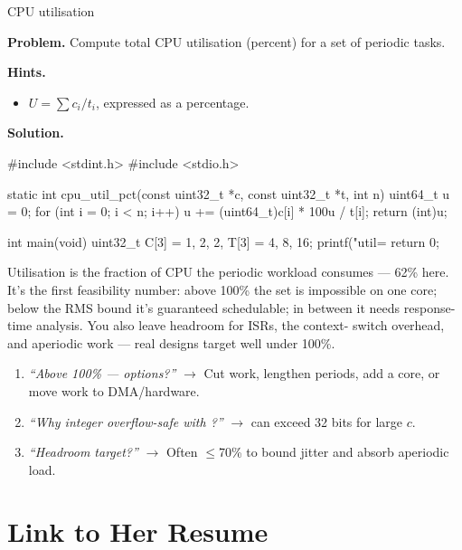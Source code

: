 \begin{gymproblem}{CPU utilisation}

\textbf{Problem.} Compute total CPU utilisation (percent) for a set of periodic
tasks.

\textbf{Hints.}
\begin{itemize}
\item $U=\sum c_i/t_i$, expressed as a percentage.
\end{itemize}

\attempt

\textbf{Solution.}
\begin{cgym}
#include <stdint.h>
#include <stdio.h>

static int cpu_util_pct(const uint32_t *c, const uint32_t *t, int n) {
    uint64_t u = 0;
    for (int i = 0; i < n; i++) u += (uint64_t)c[i] * 100u / t[i];
    return (int)u;
}

int main(void) {
    uint32_t C[3] = {1, 2, 2}, T[3] = {4, 8, 16};
    printf("util=%
    return 0;
}
\end{cgym}

Utilisation is the fraction of CPU the periodic workload consumes ---
62\% here. It's the first feasibility number: above 100\% the set is impossible
on one core; below the RMS bound it's guaranteed schedulable; in between it
needs response-time analysis. You also leave headroom for ISRs, the context-
switch overhead, and aperiodic work --- real designs target well under 100\%.

\followups
\begin{enumerate}
\item \emph{``Above 100\% --- options?''} $\rightarrow$ Cut work, lengthen
  periods, add a core, or move work to DMA/hardware.
\item \emph{``Why integer overflow-safe with ?''} $\rightarrow$
   can exceed 32 bits for large $c$.
\item \emph{``Headroom target?''} $\rightarrow$ Often $\le$70\% to bound jitter
  and absorb aperiodic load.
\end{enumerate}
\end{gymproblem}

\section{Link to Her Resume}

